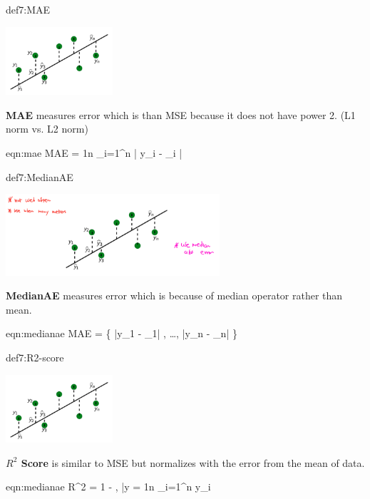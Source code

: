 \documentclass{tron}
\begin{document}
\begin{definition}{def7:MAE}
	\begin{center}
		\includegraphics[width = 150px]{Figs/Lec7/mae}
	\end{center}

	\textbf{MAE} measures error which is  than MSE because it does not have power 2. (L1 norm vs. L2 norm)
	
	\begin{eqn}[MAE]{eqn:mae}
		MAE = \frac1n \sum_{i=1}^n | y_i - _i |
	\end{eqn}
\end{definition}


\begin{definition}{def7:MedianAE}
	\begin{center}
		\includegraphics[width = 300px]{Figs/Lec7/medianae}
	\end{center}

	\textbf{MedianAE} measures error which is  because of median operator rather than mean.
	
	\begin{eqn}[MedianAE]{eqn:medianae}
		MAE = \{ |y_1 - _1| , \dots , |y_n - _n| \}
	\end{eqn}
\end{definition}

\begin{definition}[$R^2$ Score]{def7:R2-score}
	\begin{center}
		\includegraphics[width = 150px]{Figs/Lec7/mae}
	\end{center}

	\textbf{$R^2$ Score} is similar to MSE but normalizes with the error from the mean of data.
	
	\begin{eqn}[MedianAE]{eqn:medianae}
		R^2 = 1 - , \quad {} \quad \bar{y} = \frac1n \sum_{i=1}^n y_i	
	\end{eqn}
\end{definition}
\end{document}
